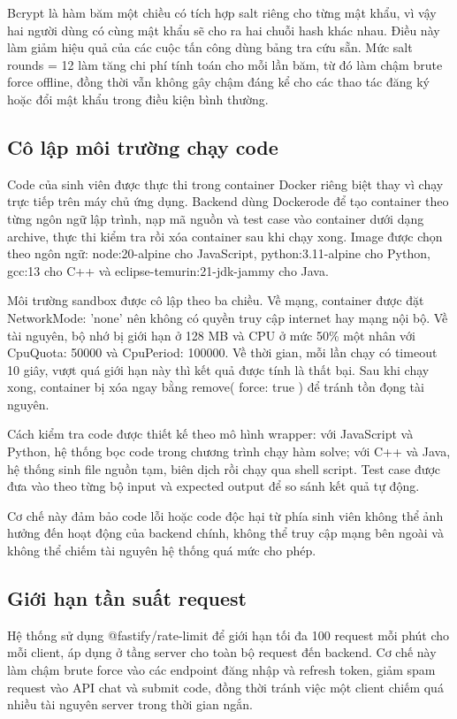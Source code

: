 \documentclass[../main.tex]{subfiles}
\begin{document}
Bcrypt là hàm băm một chiều có tích hợp salt riêng cho từng mật khẩu, vì vậy hai người dùng có cùng mật khẩu sẽ cho ra hai chuỗi hash khác nhau. Điều này làm giảm hiệu quả của các cuộc tấn công dùng bảng tra cứu sẵn. Mức salt rounds = 12 làm tăng chi phí tính toán cho mỗi lần băm, từ đó làm chậm brute force offline, đồng thời vẫn không gây chậm đáng kể cho các thao tác đăng ký hoặc đổi mật khẩu trong điều kiện bình thường.

\subsection{Cô lập môi trường chạy code}

Code của sinh viên được thực thi trong container Docker riêng biệt thay vì chạy trực tiếp trên máy chủ ứng dụng. Backend dùng Dockerode để tạo container theo từng ngôn ngữ lập trình, nạp mã nguồn và test case vào container dưới dạng archive, thực thi kiểm tra rồi xóa container sau khi chạy xong. Image được chọn theo ngôn ngữ: node:20-alpine cho JavaScript, python:3.11-alpine cho Python, gcc:13 cho C++ và eclipse-temurin:21-jdk-jammy cho Java.

Môi trường sandbox được cô lập theo ba chiều. Về mạng, container được đặt NetworkMode: 'none' nên không có quyền truy cập internet hay mạng nội bộ. Về tài nguyên, bộ nhớ bị giới hạn ở 128 MB và CPU ở mức 50\% một nhân với CpuQuota: 50000 và CpuPeriod: 100000. Về thời gian, mỗi lần chạy có timeout 10 giây, vượt quá giới hạn này thì kết quả được tính là thất bại. Sau khi chạy xong, container bị xóa ngay bằng remove({ force: true }) để tránh tồn đọng tài nguyên.

Cách kiểm tra code được thiết kế theo mô hình wrapper: với JavaScript và Python, hệ thống bọc code trong chương trình chạy hàm solve; với C++ và Java, hệ thống sinh file nguồn tạm, biên dịch rồi chạy qua shell script. Test case được đưa vào theo từng bộ input và expected output để so sánh kết quả tự động.

Cơ chế này đảm bảo code lỗi hoặc code độc hại từ phía sinh viên không thể ảnh hưởng đến hoạt động của backend chính, không thể truy cập mạng bên ngoài và không thể chiếm tài nguyên hệ thống quá mức cho phép.

\subsection{Giới hạn tần suất request}

Hệ thống sử dụng @fastify/rate-limit để giới hạn tối đa 100 request mỗi phút cho mỗi client, áp dụng ở tầng server cho toàn bộ request đến backend. Cơ chế này làm chậm brute force vào các endpoint đăng nhập và refresh token, giảm spam request vào API chat và submit code, đồng thời tránh việc một client chiếm quá nhiều tài nguyên server trong thời gian ngắn.
\end{document}
